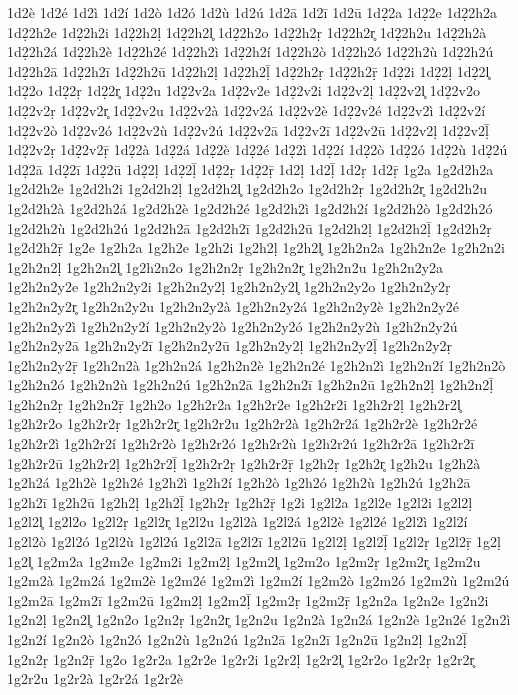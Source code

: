 {1d2è
1d2é
1d2ì
1d2í
1d2ò
1d2ó
1d2ù
1d2ú
1d2ā
1d2ī
1d2ū
1d2̣2a
1d2̣2e
1d2̣2h2a
1d2̣2h2e
1d2̣2h2i
1d2̣2h2ḷ
1d2̣2h2l̥
1d2̣2h2o
1d2̣2h2ṛ
1d2̣2h2r̥
1d2̣2h2u
1d2̣2h2à
1d2̣2h2á
1d2̣2h2è
1d2̣2h2é
1d2̣2h2ì
1d2̣2h2í
1d2̣2h2ò
1d2̣2h2ó
1d2̣2h2ù
1d2̣2h2ú
1d2̣2h2ā
1d2̣2h2ī
1d2̣2h2ū
1d2̣2h2ḷ
1d2̣2h2ḹ
1d2̣2h2ṛ
1d2̣2h2ṝ
1d2̣2i
1d2̣2ḷ
1d2̣2l̥
1d2̣2o
1d2̣2ṛ
1d2̣2r̥
1d2̣2u
1d2̣2v2a
1d2̣2v2e
1d2̣2v2i
1d2̣2v2ḷ
1d2̣2v2l̥
1d2̣2v2o
1d2̣2v2ṛ
1d2̣2v2r̥
1d2̣2v2u
1d2̣2v2à
1d2̣2v2á
1d2̣2v2è
1d2̣2v2é
1d2̣2v2ì
1d2̣2v2í
1d2̣2v2ò
1d2̣2v2ó
1d2̣2v2ù
1d2̣2v2ú
1d2̣2v2ā
1d2̣2v2ī
1d2̣2v2ū
1d2̣2v2ḷ
1d2̣2v2ḹ
1d2̣2v2ṛ
1d2̣2v2ṝ
1d2̣2à
1d2̣2á
1d2̣2è
1d2̣2é
1d2̣2ì
1d2̣2í
1d2̣2ò
1d2̣2ó
1d2̣2ù
1d2̣2ú
1d2̣2ā
1d2̣2ī
1d2̣2ū
1d2̣2ḷ
1d2̣2ḹ
1d2̣2ṛ
1d2̣2ṝ
1d2ḷ
1d2ḹ
1d2ṛ
1d2ṝ
1g2a
1g2d2h2a
1g2d2h2e
1g2d2h2i
1g2d2h2ḷ
1g2d2h2l̥
1g2d2h2o
1g2d2h2ṛ
1g2d2h2r̥
1g2d2h2u
1g2d2h2à
1g2d2h2á
1g2d2h2è
1g2d2h2é
1g2d2h2ì
1g2d2h2í
1g2d2h2ò
1g2d2h2ó
1g2d2h2ù
1g2d2h2ú
1g2d2h2ā
1g2d2h2ī
1g2d2h2ū
1g2d2h2ḷ
1g2d2h2ḹ
1g2d2h2ṛ
1g2d2h2ṝ
1g2e
1g2h2a
1g2h2e
1g2h2i
1g2h2ḷ
1g2h2l̥
1g2h2n2a
1g2h2n2e
1g2h2n2i
1g2h2n2ḷ
1g2h2n2l̥
1g2h2n2o
1g2h2n2ṛ
1g2h2n2r̥
1g2h2n2u
1g2h2n2y2a
1g2h2n2y2e
1g2h2n2y2i
1g2h2n2y2ḷ
1g2h2n2y2l̥
1g2h2n2y2o
1g2h2n2y2ṛ
1g2h2n2y2r̥
1g2h2n2y2u
1g2h2n2y2à
1g2h2n2y2á
1g2h2n2y2è
1g2h2n2y2é
1g2h2n2y2ì
1g2h2n2y2í
1g2h2n2y2ò
1g2h2n2y2ó
1g2h2n2y2ù
1g2h2n2y2ú
1g2h2n2y2ā
1g2h2n2y2ī
1g2h2n2y2ū
1g2h2n2y2ḷ
1g2h2n2y2ḹ
1g2h2n2y2ṛ
1g2h2n2y2ṝ
1g2h2n2à
1g2h2n2á
1g2h2n2è
1g2h2n2é
1g2h2n2ì
1g2h2n2í
1g2h2n2ò
1g2h2n2ó
1g2h2n2ù
1g2h2n2ú
1g2h2n2ā
1g2h2n2ī
1g2h2n2ū
1g2h2n2ḷ
1g2h2n2ḹ
1g2h2n2ṛ
1g2h2n2ṝ
1g2h2o
1g2h2r2a
1g2h2r2e
1g2h2r2i
1g2h2r2ḷ
1g2h2r2l̥
1g2h2r2o
1g2h2r2ṛ
1g2h2r2r̥
1g2h2r2u
1g2h2r2à
1g2h2r2á
1g2h2r2è
1g2h2r2é
1g2h2r2ì
1g2h2r2í
1g2h2r2ò
1g2h2r2ó
1g2h2r2ù
1g2h2r2ú
1g2h2r2ā
1g2h2r2ī
1g2h2r2ū
1g2h2r2ḷ
1g2h2r2ḹ
1g2h2r2ṛ
1g2h2r2ṝ
1g2h2ṛ
1g2h2r̥
1g2h2u
1g2h2à
1g2h2á
1g2h2è
1g2h2é
1g2h2ì
1g2h2í
1g2h2ò
1g2h2ó
1g2h2ù
1g2h2ú
1g2h2ā
1g2h2ī
1g2h2ū
1g2h2ḷ
1g2h2ḹ
1g2h2ṛ
1g2h2ṝ
1g2i
1g2l2a
1g2l2e
1g2l2i
1g2l2ḷ
1g2l2l̥
1g2l2o
1g2l2ṛ
1g2l2r̥
1g2l2u
1g2l2à
1g2l2á
1g2l2è
1g2l2é
1g2l2ì
1g2l2í
1g2l2ò
1g2l2ó
1g2l2ù
1g2l2ú
1g2l2ā
1g2l2ī
1g2l2ū
1g2l2ḷ
1g2l2ḹ
1g2l2ṛ
1g2l2ṝ
1g2ḷ
1g2l̥
1g2m2a
1g2m2e
1g2m2i
1g2m2ḷ
1g2m2l̥
1g2m2o
1g2m2ṛ
1g2m2r̥
1g2m2u
1g2m2à
1g2m2á
1g2m2è
1g2m2é
1g2m2ì
1g2m2í
1g2m2ò
1g2m2ó
1g2m2ù
1g2m2ú
1g2m2ā
1g2m2ī
1g2m2ū
1g2m2ḷ
1g2m2ḹ
1g2m2ṛ
1g2m2ṝ
1g2n2a
1g2n2e
1g2n2i
1g2n2ḷ
1g2n2l̥
1g2n2o
1g2n2ṛ
1g2n2r̥
1g2n2u
1g2n2à
1g2n2á
1g2n2è
1g2n2é
1g2n2ì
1g2n2í
1g2n2ò
1g2n2ó
1g2n2ù
1g2n2ú
1g2n2ā
1g2n2ī
1g2n2ū
1g2n2ḷ
1g2n2ḹ
1g2n2ṛ
1g2n2ṝ
1g2o
1g2r2a
1g2r2e
1g2r2i
1g2r2ḷ
1g2r2l̥
1g2r2o
1g2r2ṛ
1g2r2r̥
1g2r2u
1g2r2à
1g2r2á
1g2r2è
}
